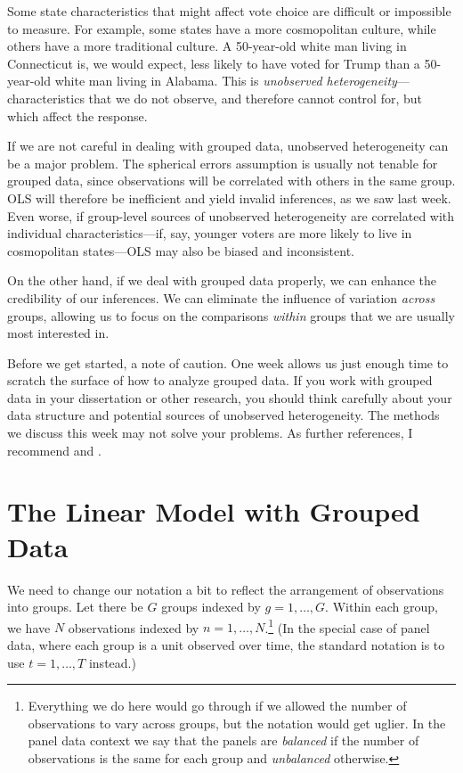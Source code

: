 \documentclass[
  12pt,
  oneside,openany]{book}
\begin{document}
Some state characteristics that might affect vote choice are difficult or impossible to measure. For example, some states have a more cosmopolitan culture, while others have a more traditional culture. A 50-year-old white man living in Connecticut is, we would expect, less likely to have voted for Trump than a 50-year-old white man living in Alabama. This is \emph{unobserved heterogeneity}---characteristics that we do not observe, and therefore cannot control for, but which affect the response.

If we are not careful in dealing with grouped data, unobserved heterogeneity can be a major problem. The spherical errors assumption is usually not tenable for grouped data, since observations will be correlated with others in the same group. OLS will therefore be inefficient and yield invalid inferences, as we saw last week. Even worse, if group-level sources of unobserved heterogeneity are correlated with individual characteristics---if, say, younger voters are more likely to live in cosmopolitan states---OLS may also be biased and inconsistent.

On the other hand, if we deal with grouped data properly, we can enhance the credibility of our inferences. We can eliminate the influence of variation \emph{across} groups, allowing us to focus on the comparisons \emph{within} groups that we are usually most interested in.

Before we get started, a note of caution. One week allows us just enough time to scratch the surface of how to analyze grouped data. If you work with grouped data in your dissertation or other research, you should think carefully about your data structure and potential sources of unobserved heterogeneity. The methods we discuss this week may not solve your problems. As further references, I recommend \citet{Wooldridge:2002vr} and \citet{gelman2006data}.

\hypertarget{the-linear-model-with-grouped-data}{%
\section{The Linear Model with Grouped Data}\label{the-linear-model-with-grouped-data}}

We need to change our notation a bit to reflect the arrangement of observations into groups. Let there be \(G\) groups indexed by \(g = 1, \ldots, G\). Within each group, we have \(N\) observations indexed by \(n = 1, \ldots, N\).\footnote{Everything we do here would go through if we allowed the number of observations to vary across groups, but the notation would get uglier. In the panel data context we say that the panels are \emph{balanced} if the number of observations is the same for each group and \emph{unbalanced} otherwise.} (In the special case of panel data, where each group is a unit observed over time, the standard notation is to use \(t = 1, \ldots, T\) instead.)
\end{document}
